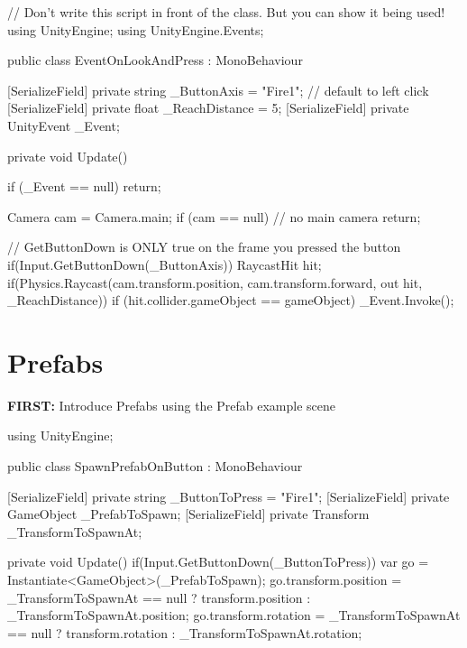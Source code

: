 \documentclass[11pt]{article}
\def\StartLineAt#1{\lstset{firstnumber=#1}}
\begin{document}
\StartLineAt{1}
\begin{csharp}
// Don't write this script in front of the class.  But you can show it being used!
using UnityEngine;
using UnityEngine.Events;

public class EventOnLookAndPress : MonoBehaviour
{
    [SerializeField]
    private string _ButtonAxis = "Fire1"; // default to left click
    [SerializeField]
    private float _ReachDistance = 5;
    [SerializeField]
    private UnityEvent _Event;

    private void Update()
    {
        if (_Event == null)
            return;

        Camera cam = Camera.main;
        if (cam == null) // no main camera
            return;

        // GetButtonDown is ONLY true on the frame you pressed the button
        if(Input.GetButtonDown(_ButtonAxis))
        {
            RaycastHit hit;
            if(Physics.Raycast(cam.transform.position, cam.transform.forward, out hit, _ReachDistance))
            {
                if (hit.collider.gameObject == gameObject)
                    _Event.Invoke();
            }
        }
    }
}
\end{csharp}

\section{Prefabs}

\textbf{FIRST: } Introduce Prefabs using the Prefab example scene

\StartLineAt{1}
\begin{csharp}
using UnityEngine;

public class SpawnPrefabOnButton : MonoBehaviour
{
    [SerializeField]
    private string _ButtonToPress = "Fire1";
    [SerializeField]
    private GameObject _PrefabToSpawn;
    [SerializeField]
    private Transform _TransformToSpawnAt;

    private void Update()
    {
        if(Input.GetButtonDown(_ButtonToPress))
        {
            var go = Instantiate<GameObject>(_PrefabToSpawn);
            go.transform.position = _TransformToSpawnAt == null ? transform.position : _TransformToSpawnAt.position;
            go.transform.rotation = _TransformToSpawnAt == null ? transform.rotation : _TransformToSpawnAt.rotation;
        }
    }
}
\end{csharp}
\end{document}
